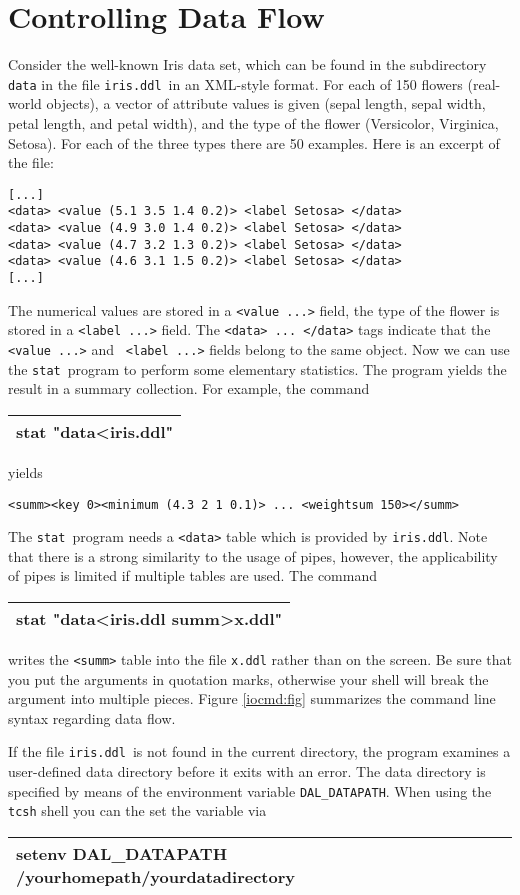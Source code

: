 \documentclass[a4paper]{book}
\newcommand{\cmd}[1]{%
{\vspace{-2mm}\tt\begin{center}\begin{tabular}{||l||}%
\hline%
#1\\%
\hline%
\end{tabular}\end{center}}\vspace{-2mm}}
\newcommand{\printprogram}[1]{{\tt #1}\index{#1}}
\newcommand{\iris}{{\tt iris.ddl}\index{iris.ddl}}
\newcommand{\pstat}{\printprogram{stat}}
\begin{document}
\section{Controlling Data Flow}

Consider the well-known Iris data set, which can be found in the subdirectory
\verb+data+ in the file \iris\ in an XML-style format. For each of 150
flowers (real-world objects), a vector of attribute values is given (sepal
length, sepal width, petal length, and petal width), and the type of the flower
(Versicolor, Virginica, Setosa). For each of the three types there are 50
examples. Here is an excerpt of the file:

\begin{verbatim}
[...]
<data> <value (5.1 3.5 1.4 0.2)> <label Setosa> </data>
<data> <value (4.9 3.0 1.4 0.2)> <label Setosa> </data>
<data> <value (4.7 3.2 1.3 0.2)> <label Setosa> </data>
<data> <value (4.6 3.1 1.5 0.2)> <label Setosa> </data>
[...]
\end{verbatim}

The numerical values are stored in a {\tt <value ...>} field, the type
of the flower is stored in a {\tt <label ...>} field. The {\tt <data>
... </data>} tags indicate that the {\tt <value ...>} and {\tt
<label ...>} fields belong to the same object. Now we can use the
\pstat\ program to perform some elementary statistics. The program
yields the result in a summary collection.  For example, the
command \cmd{stat "data<iris.ddl"} yields
\begin{verbatim}
<summ><key 0><minimum (4.3 2 1 0.1)> ... <weightsum 150></summ>
\end{verbatim}
The \pstat\ program needs a {\tt <data>} table which is provided by
{\tt iris.ddl}. Note that there is a strong similarity to the usage of
pipes, however, the applicability of pipes is limited if multiple
tables are used. The command \cmd{stat "data<iris.ddl summ>x.ddl"}
writes the {\tt <summ>} table into the file {\tt x.ddl} rather than on
the screen. Be sure that you put the arguments in quotation marks,
otherwise your shell will break the argument into multiple pieces.
Figure \ref{iocmd:fig} summarizes the command line syntax regarding
data flow.

If the file \iris\ is not found in the current directory, the program
examines a user-defined data directory before it exits with an
error. The data directory is specified by means of the environment
variable {\tt DAL\_DATAPATH}. When using the {\tt tcsh} shell you can the set
the variable via
\cmd{setenv DAL\_DATAPATH /yourhomepath/yourdatadirectory}
\end{document}
